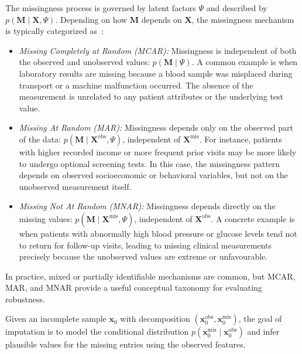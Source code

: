 \documentclass[times, review, 10pt]{elsarticle}
\begin{document}
The missingness process is governed by latent factors $\Psi$ and described by $p(\mathbf{M}\mid \mathbf{X}, \Psi)$. Depending on how $\mathbf{M}$ depends on $\mathbf{X}$, the missingness mechanism is typically categorized as~\cite{MNAR}:
\begin{itemize}

\item \textit{Missing Completely at Random (MCAR):} Missingness is independent of both the observed and unobserved values: $p(\mathbf{M}\mid \Psi)$. A common example is when laboratory results are missing because a blood sample was misplaced during transport or a machine malfunction occurred. The absence of the measurement is unrelated to any patient attributes or the underlying test value.

\item \textit{Missing At Random (MAR):} Missingness depends only on the observed part of the data: $p(\mathbf{M}\mid \mathbf{X}^{\mathrm{obs}},\Psi)$, independent of $\mathbf{X}^{\mathrm{mis}}$. For instance, patients with higher recorded income or more frequent prior visits may be more likely to undergo optional screening tests. In this case, the missingness pattern depends on observed socioeconomic or behavioral variables, but not on the unobserved measurement itself.

\item \textit{Missing Not At Random (MNAR):} Missingness depends directly on the missing values: $
p(\mathbf{M}\mid \mathbf{X}^{\mathrm{mis}},\Psi)$, independent of $\mathbf{X}^{\mathrm{obs}}$. A concrete example is when patients with abnormally high blood pressure or glucose levels tend not to return for follow-up visits, leading to missing clinical measurements precisely because the unobserved values are extreme or unfavourable.

\end{itemize}
In practice, mixed or partially identifiable mechanisms are common, but MCAR, MAR, and MNAR provide a useful conceptual taxonomy for evaluating robustness.

Given an incomplete sample $\mathbf{x}_0$ with decomposition $(\mathbf{x}_0^{\mathrm{obs}}, \mathbf{x}_0^{\mathrm{mis}})$, the goal of imputation is to model the conditional distribution
$p(\mathbf{x}^{\mathrm{mis}}_0 \mid \mathbf{x}^{\mathrm{obs}}_0)$
and infer plausible values for the missing entries using the observed features.

\end{document}
